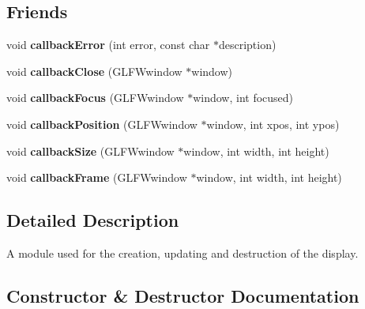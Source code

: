 \subsection*{Friends}
\begin{DoxyCompactItemize}
\item 
\mbox{\label{classflounder_1_1display_a6e2f7636c5e3fe93e7ae254f055d2ac1}} 
void {\bfseries callback\+Error} (int error, const char $\ast$description)
\item 
\mbox{\label{classflounder_1_1display_ad1fb7c8678d6c41a7b539440f01df61e}} 
void {\bfseries callback\+Close} (G\+L\+F\+Wwindow $\ast$window)
\item 
\mbox{\label{classflounder_1_1display_ac00c6be12bf18837bd3960c3ba402f3f}} 
void {\bfseries callback\+Focus} (G\+L\+F\+Wwindow $\ast$window, int focused)
\item 
\mbox{\label{classflounder_1_1display_a39d3d8fb74851349d8a437aa6a3f2b35}} 
void {\bfseries callback\+Position} (G\+L\+F\+Wwindow $\ast$window, int xpos, int ypos)
\item 
\mbox{\label{classflounder_1_1display_af765170864757051f6a767c26700bb82}} 
void {\bfseries callback\+Size} (G\+L\+F\+Wwindow $\ast$window, int width, int height)
\item 
\mbox{\label{classflounder_1_1display_a0d3e5fdd07e5059768ff51de12b0b29f}} 
void {\bfseries callback\+Frame} (G\+L\+F\+Wwindow $\ast$window, int width, int height)
\end{DoxyCompactItemize}


\subsection{Detailed Description}
A module used for the creation, updating and destruction of the display. 



\subsection{Constructor \& Destructor Documentation}
\mbox{\label{classflounder_1_1display_ac0a3910222a928f1fc60193cd65c0530}} 
